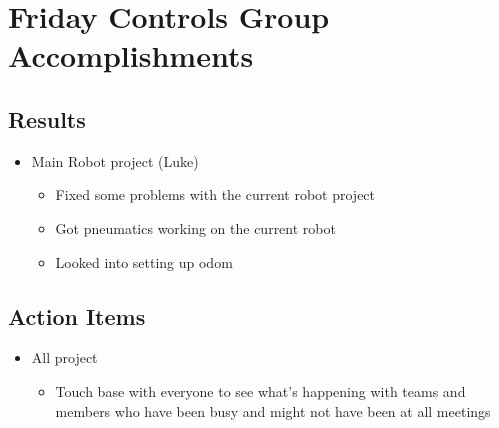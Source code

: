 \section{Friday Controls Group Accomplishments}

\subsection{Results}
\begin{itemize}
    \item Main Robot project (Luke)
    \begin{itemize}
        \item Fixed some problems with the current robot project
        \item Got pneumatics working on the current robot
        \item Looked into setting up odom
    \end{itemize}
\end{itemize}

\subsection{Action Items}
\begin{itemize}
    \item All project
    \begin{itemize}
        \item Touch base with everyone to see what’s happening with teams and members who have been busy and might not have been at all meetings
    \end{itemize}
\end{itemize}
